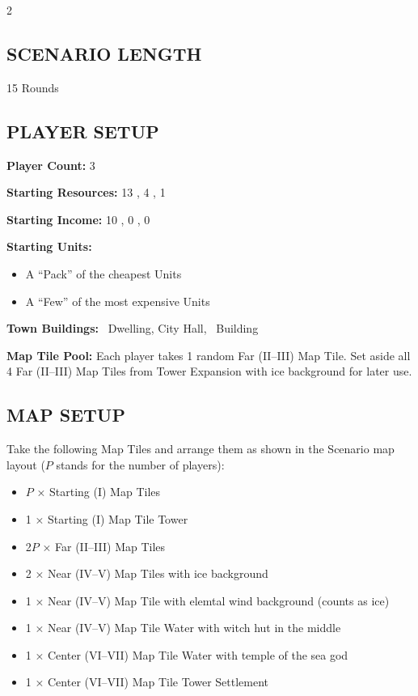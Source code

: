 \begin{multicols*}{2}
\subsection*{\MakeUppercase{Scenario Length}}

15 Rounds

\subsection*{\MakeUppercase{Player Setup}}

\textbf{Player Count:} 3

\textbf{Starting Resources:} 13 , 4 , 1 

\textbf{Starting Income:} 10 , 0 , 0 

\textbf{Starting Units:}
\begin{itemize}
  \item A ``Pack'' of the cheapest  Units
  \item A ``Few'' of the most expensive  Units
\end{itemize}

\textbf{Town Buildings:} ~Dwelling, City Hall, ~Building

\textbf{Map Tile Pool:} Each player takes 1 random Far (II--III) Map Tile. Set aside all 4 Far (II--III) Map Tiles from Tower Expansion with ice background for later use.

\subsection*{\MakeUppercase{Map Setup}}

Take the following Map Tiles and arrange them as shown in the Scenario map layout ($P$ stands for the number of players):
\begin{itemize}
  \item $P$ × Starting (I) Map Tiles
  \item 1 × Starting (I) Map Tile Tower
  \item 2$P$ × Far (II--III) Map Tiles
  \item 2 × Near (IV--V) Map Tiles with ice background
  \item 1 × Near (IV--V) Map Tile with elemtal wind background (counts as ice)
  \item 1 × Near (IV--V) Map Tile Water with witch hut in the middle
  \item 1 × Center (VI--VII) Map Tile Water with temple of the sea god
  \item 1 × Center (VI--VII) Map Tile Tower Settlement
\end{itemize}


\end{multicols*}
